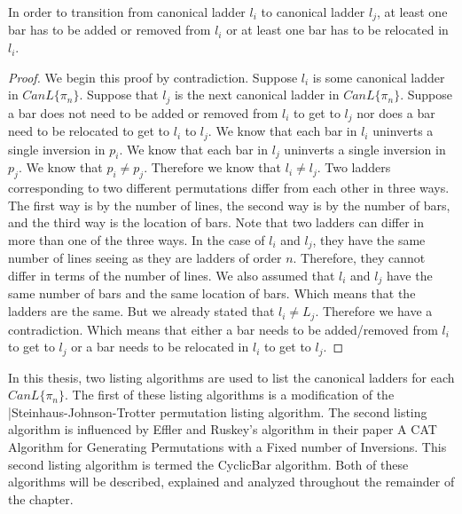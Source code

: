 \begin{theorem}
    In order to transition from canonical ladder $l_{i}$ to canonical ladder $l_{j}$, at least one bar has to be added or 
    removed from $l_{i}$ or at least one bar has to be relocated in $l_{i}$.
\end{theorem}
\begin{proof}
    We begin this proof by contradiction. Suppose $l_{i}$ is some canonical ladder in $CanL\{\pi_{n}\}$. 
    Suppose that $l_{j}$ is the next canonical ladder in $CanL\{\pi_{n}\}$. 
    Suppose a bar does not need to be added or removed from $l_{i}$ to get to $l_{j}$ nor does a bar need to be relocated to get to $l_{i}$ to 
    $l_{j}$. We know that each bar in $l_{i}$ uninverts a single inversion in $p_{i}$. We know that each bar in $l_{j}$ 
    uninverts a single inversion in $p_{j}$. We know that $p_{i} \neq p_{j}$. Therefore we know that $l_{i} \neq l_{j}$. 
    Two ladders corresponding to 
    two different permutations differ from each other in three ways. The first way is by the number of lines, the second way is by the number of 
    bars, and the third way is the location of bars. Note that two ladders can differ in more than one of the three ways. In the case 
    of $l_{i}$ and $l_{j}$, they have the same number of lines seeing as they are ladders of order $n$. Therefore, they cannot differ in terms 
    of the number of lines. We also assumed that $l_{i}$ and $l_{j}$ have the same number of bars and the same location of bars. Which means 
    that the ladders are the same. But we already stated that $l_{i} \neq L_{j}$. Therefore we have a contradiction. Which means that 
    either a bar needs to be added/removed from $l_{i}$ to get to $l_{j}$ or a bar needs to be relocated in $l_{i}$ to get to $l_{j}$.
\end{proof}



In this thesis, two listing algorithms are used to list the canonical 
ladders for each $CanL\{\pi_{n}\}$. The first of these listing algorithms 
is a modification of the |{\sc Steinhaus-Johnson-Trotter} permutation listing algorithm. 
The second listing algorithm is influenced by Effler and Ruskey's algorithm in their paper 
A CAT Algorithm for Generating Permutations with a Fixed number of Inversions. 
This second listing algorithm is termed the {\sc CyclicBar} algorithm. Both of these algorithms will 
be described, explained and analyzed throughout the remainder of the chapter.\par

